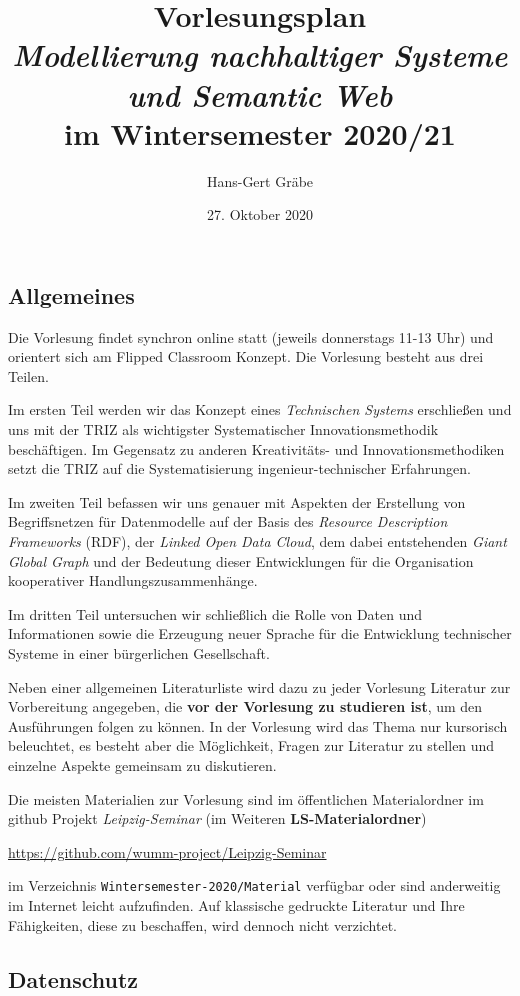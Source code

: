 \documentclass[11pt,a4paper]{article}
\title{Vorlesungsplan \\[1em] \emph{Modellierung nachhaltiger Systeme und
    Semantic Web} \\[1em] im Wintersemester 2020/21}
\author{Hans-Gert Gr\"abe}
\date{27. Oktober 2020}
\begin{document}
\maketitle
\tableofcontents
\newpage
\subsection{Allgemeines}

Die Vorlesung findet synchron online statt (jeweils donnerstags 11-13 Uhr) und
orientert sich am Flipped Classroom Konzept. Die Vorlesung besteht aus drei
Teilen.

Im ersten Teil werden wir das Konzept eines \emph{Technischen Systems}
erschließen und uns mit der TRIZ als wichtigster Systematischer
Innovationsmethodik beschäftigen.  Im Gegensatz zu anderen Kreativitäts- und
Innovationsmethodiken setzt die TRIZ auf die Systematisierung
ingenieur-technischer Erfahrungen. 

Im zweiten Teil befassen wir uns genauer mit Aspekten der Erstellung von
Begriffsnetzen für Datenmodelle auf der Basis des \emph{Resource Description
  Frameworks} (RDF), der \emph{Linked Open Data Cloud}, dem dabei entstehenden
\emph{Giant Global Graph} und der Bedeutung dieser Entwicklungen für die
Organisation kooperativer Handlungszusammenhänge.

Im dritten Teil untersuchen wir schließlich die Rolle von Daten und
Informationen sowie die Erzeugung neuer Sprache für die Entwicklung
technischer Systeme in einer bürgerlichen Gesellschaft.

Neben einer allgemeinen Literaturliste wird dazu zu jeder Vorlesung Literatur
zur Vorbereitung angegeben, die \textbf{vor der Vorlesung zu studieren ist},
um den Ausführungen folgen zu können. In der Vorlesung wird das Thema nur
kursorisch beleuchtet, es besteht aber die Möglichkeit, Fragen zur Literatur
zu stellen und einzelne Aspekte gemeinsam zu diskutieren.

Die meisten Materialien zur Vorlesung sind im öffentlichen Materialordner im
github Projekt \emph{Leipzig-Seminar} (im Weiteren \textbf{LS-Materialordner})
\begin{center}
  \url{https://github.com/wumm-project/Leipzig-Seminar}
\end{center}
im Verzeichnis \texttt{Wintersemester-2020/Material} verfügbar oder sind
anderweitig im Internet leicht aufzufinden. Auf klassische gedruckte Literatur
und Ihre Fähigkeiten, diese zu beschaffen, wird dennoch nicht verzichtet.

\subsection{Datenschutz}
\end{document}
